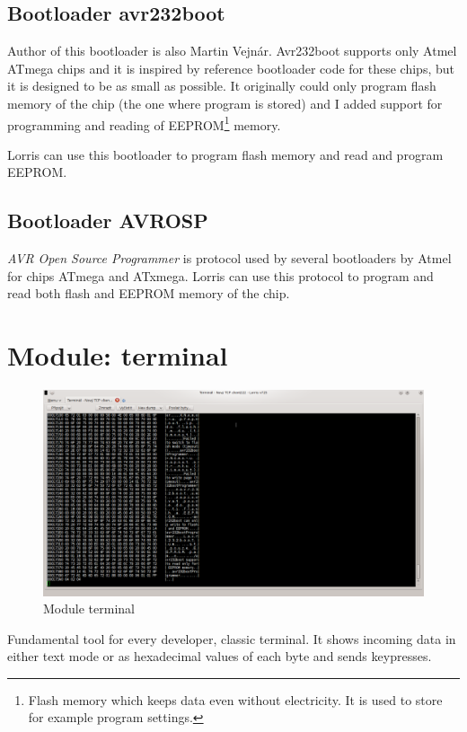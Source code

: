 \documentclass[12pt, a4paper, oneside]{article}
\newcommand{\It}{\textit}  %
\begin{document}
\subsection{Bootloader avr232boot}
Author of this bootloader is also Martin Vejnár. Avr232boot supports only Atmel ATmega chips and it is inspired by reference bootloader code for these chips, but it is designed to be as small as possible. It originally could only program flash memory of the chip (the one where program is stored) and I added support for programming and reading of EEPROM\footnote{Flash memory which keeps data even without electricity. It is used to store for example program settings.} memory.

Lorris can use this bootloader to program flash memory and read and program EEPROM.

\subsection{Bootloader AVROSP}
\It{AVR Open Source Programmer} is protocol used by several bootloaders by Atmel for chips ATmega and ATxmega. Lorris can use this protocol to program and read both flash and EEPROM memory of the chip.

\newpage
\section{Module: terminal}
\begin{figure}[H]
\begin{center}
\includegraphics[width=\textwidth]{img/terminal.png}
\caption{Module terminal}
\label{Terminal}
\end{center}
\end{figure}
Fundamental tool for every developer, classic terminal. It shows incoming data in either text mode or as hexadecimal values of each byte and sends keypresses.
\end{document}
